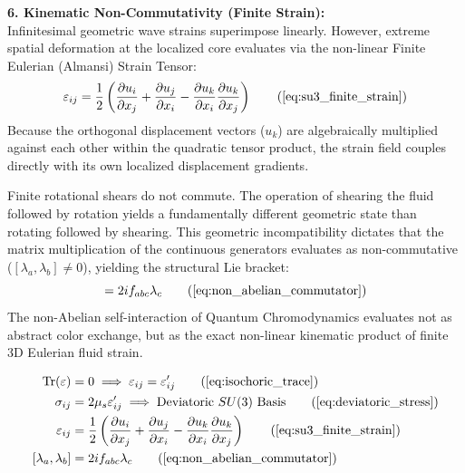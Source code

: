 \documentclass[11pt, a4paper]{article}
\begin{document}
\textbf{6. Kinematic Non-Commutativity (Finite Strain):} \\
Infinitesimal geometric wave strains superimpose linearly. However, extreme spatial deformation at the localized core evaluates via the non-linear Finite Eulerian (Almansi) Strain Tensor:
\begin{equation}
    \varepsilon_{ij} = \frac{1}{2} \left( \frac{\partial u_i}{\partial x_j} + \frac{\partial u_j}{\partial x_i} - \frac{\partial u_k}{\partial x_i} \frac{\partial u_k}{\partial x_j} \right) \tag{\ref{eq:su3_finite_strain}}
\end{equation}
Because the orthogonal displacement vectors ($u_k$) are algebraically multiplied against each other within the quadratic tensor product, the strain field couples directly with its own localized displacement gradients. 

Finite rotational shears do not commute. The operation of shearing the fluid followed by rotation yields a fundamentally different geometric state than rotating followed by shearing. This geometric incompatibility dictates that the matrix multiplication of the continuous generators evaluates as non-commutative ($[\lambda_a, \lambda_b] \neq 0$), yielding the structural Lie bracket:
\begin{equation}
    [\lambda_a, \lambda_b] = 2i f_{abc} \lambda_c \tag{\ref{eq:non_abelian_commutator}}
\end{equation}
The non-Abelian self-interaction of Quantum Chromodynamics evaluates not as abstract color exchange, but as the exact non-linear kinematic product of finite 3D Eulerian fluid strain.

\begin{tcolorbox}[recallbox, title={\ref{box:hookes_su3}. Generalized Hooke's Law \& $SU(3)$}]
\begin{align}
    \text{Tr}(\varepsilon) &= 0 \implies \varepsilon_{ij} = \varepsilon'_{ij} \tag{\ref{eq:isochoric_trace}} \\
    \sigma_{ij} &= 2\mu_s \varepsilon'_{ij} \implies \text{Deviatoric } SU(3) \text{ Basis} \tag{\ref{eq:deviatoric_stress}} \\
    \varepsilon_{ij} &= \frac{1}{2} \left( \frac{\partial u_i}{\partial x_j} + \frac{\partial u_j}{\partial x_i} - \frac{\partial u_k}{\partial x_i} \frac{\partial u_k}{\partial x_j} \right) \tag{\ref{eq:su3_finite_strain}} \\
    [\lambda_a, \lambda_b] &= 2i f_{abc} \lambda_c \tag{\ref{eq:non_abelian_commutator}}
\end{align}
\end{tcolorbox}
\end{document}
